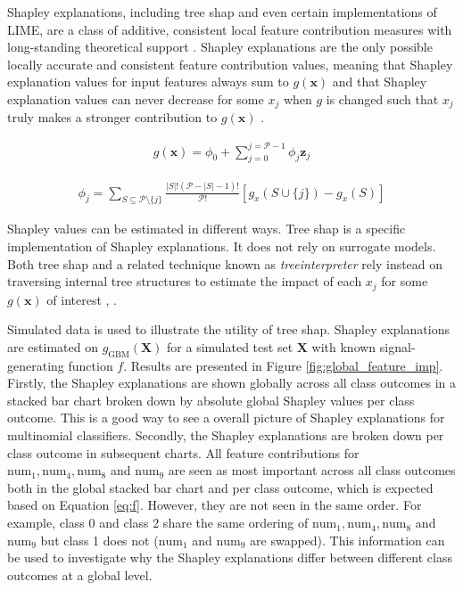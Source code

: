 \documentclass{article}
\begin{document}
Shapley explanations, including tree shap and even certain implementations of LIME, are a class of additive, consistent local feature contribution measures with long-standing theoretical support \cite{shapley}. Shapley explanations are the only possible locally accurate and consistent feature contribution values, meaning that Shapley explanation values for input features always sum to $g(\mathbf{x})$ and that Shapley explanation values can never decrease for some $x_j$ when $g$ is changed such that $x_j$ truly makes a stronger contribution to $g(\mathbf{x})$ \cite{shapley}. 

\begin{equation}
\label{eq:shap_additive}
\begin{aligned}
g(\mathbf{x}) = \phi_0 + \sum_{j=0}^{j=\mathcal{P} - 1} \phi_j \mathbf{z}_j
\end{aligned}
\end{equation}

\begin{equation}
\label{eq:shap_contrib}
\begin{aligned}
\phi_{j} = \sum_{S \subseteq \mathcal{P} \setminus \{j\}}\frac{|S|!(\mathcal{P} -|S| -1)!}{\mathcal{P}!}[g_x(S \cup \{j\}) - g_x(S)]
\end{aligned}
\end{equation}

Shapley values can be estimated in different ways. Tree shap is a specific implementation of Shapley explanations. It does not rely on surrogate models. Both tree shap and a related technique known as \textit{treeinterpreter} rely instead on traversing internal tree structures to estimate the impact of each $x_j$ for some $g(\mathbf{x})$ of interest \cite{tree_shap}, \cite{treeinterpreter}.

Simulated data is used to illustrate the utility of tree shap. Shapley explanations are estimated on $g_{\text{GBM}}(\mathbf{X})$ for a simulated test set $\mathbf{X}$ with known signal-generating function $f$. Results are presented in Figure \ref{fig:global_feature_imp}. Firstly, the Shapley explanations are shown globally across all class outcomes in a stacked bar chart broken down by absolute global Shapley values per class outcome. This is a good way to see a overall picture of Shapley explanations for multinomial classifiers. Secondly, the Shapley explanations are broken down per class outcome in subsequent charts. All feature contributions for $\text{num}_1, \text{num}_4, \text{num}_8$ and $\text{num}_9$ are seen as most important across all class outcomes both in the global stacked bar chart and per class outcome, which is expected based on Equation \ref{eq:f}. However, they are not seen in the same order. For example, class 0 and class 2 share the same ordering of $\text{num}_1, \text{num}_4, \text{num}_8$ and $\text{num}_9$ but class 1 does not ($\text{num}_1$ and $\text{num}_9$ are swapped). This information can be used to investigate why the Shapley explanations differ between different class outcomes at a global level.
\end{document}
